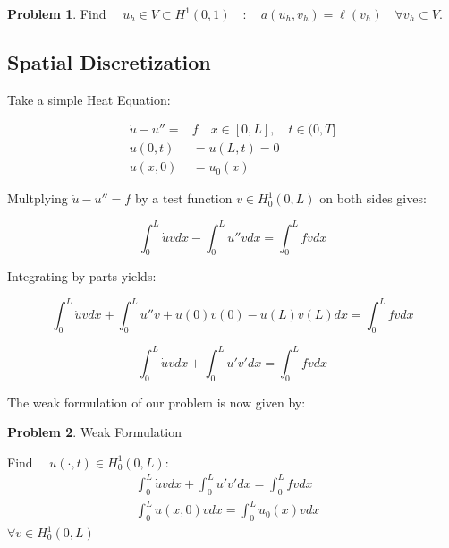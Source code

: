 \documentclass{uonmathreport}
\theoremstyle{definition}
\theoremstyle{problem}
\newtheorem{problem}{Problem}[section]
\theoremstyle{theorem}
\begin{document}
\begin{problem} \label{prob:Approx1}
Find $\quad u_h \in  V\subset H^1(0, 1) \quad : \quad a(u_h, v_h) =  \ell(v_h) \quad \forall v_h \subset V.$
\end{problem}



\subsection{Spatial Discretization} \label{subsec:Subspace}



Take a simple Heat Equation:



\begin{subequations} 
\begin{align}
  \dot{u} - u'' = & f \quad x \in [0, L], \quad t \in (0, T]  \\ \label{eq:Simple Heat}
  u(0, t) & = u(L, t) = 0\\
  u(x, 0) & = u_0(x)   
\end{align}
\end{subequations}

Multplying $\dot{u} - u'' = f$ by a test function  $v \in H^1_0(0, L)$  on both sides gives:

\begin{equation}
  \int_0^L \dot{u} v dx  - \int_0^L  u'' v  dx =   \int_0^L  f v  dx   
\end{equation}

Integrating by parts yields:

\begin{equation}
  \int_0^L \dot{u} v dx  + \int_0^L  u'' v  +u(0)v(0) - u(L)v(L) dx =   \int_0^L  f v  dx   
\end{equation}

\begin{equation}
  \int_0^L \dot{u} v dx +  \int_0^L  u' v'  dx =   \int_0^L  f v  dx    
\end{equation}

The weak formulation of our problem is now given by:

\begin{problem}{Weak Formulation}


Find $\quad u(\cdot, t) \in H^1_0(0, L)$:
\begin{align*}
 \int_0^L \dot{u} v dx +  \int_0^L  u' v'  dx =   \int_0^L  f v  dx& \\
  \int_0^L  u(x, 0) v dx = \int_0^L u_0(x) v dx&  
\end{align*}
$\forall v \in H^1_0(0, L)$

\end{problem}
\end{document}
